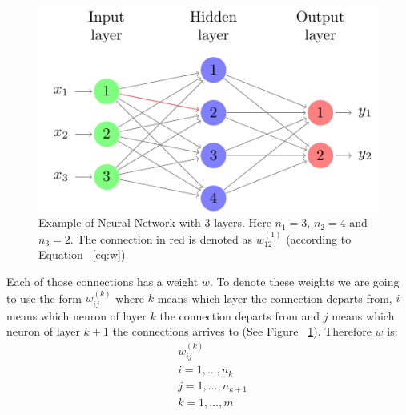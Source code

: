 \begin{figure}
  \center
  \includegraphics[scale=1.5]{images/net2.pdf}
  \caption{\label{fig:net2}Example of Neural Network with 3 layers. Here $n_1=3$, $n_2=4$ and $n_3=2$. The connection in red is denoted as $w^{(1)}_{12}$ (according to Equation ~\ref{eq:w})}
\end{figure}

Each of those connections has a weight $w$. To denote these weights we are going to use the form $w_{ij}^{(k)}$ where $k$ means which layer the connection departs from, $i$ means which neuron of layer $k$ the connection departs from and $j$ means which neuron of layer $k+1$ the connections arrives to (See Figure ~\ref{fig:net2}). Therefore $w$ is:
\begin{equation}
\begin{aligned}
  & w^{(k)}_{ij} \\
  & i=1,\dots,n_k \\
  & j=1,\dots,n_{k+1} \\
  & k=1,\dots,m
\end{aligned}
\label{eq:w}
\end{equation}\\

